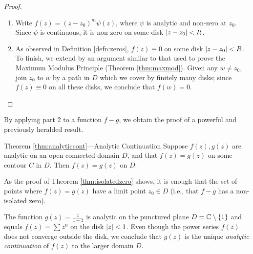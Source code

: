 \begin{proof}
	\begin{enumerate}\itemsep0pt
	  \item Write $f(z)=(z-z_0)^m\psi(z)$, where $\psi$ is analytic and non-zero at $z_0$. Since $\psi$ is continuous, it is non-zero on some disk $\left| z-z_0\right|<R$.
	  \item As observed in Definition \ref{defn:zeros}, $f(z)\equiv 0$ on some disk $\left| z-z_0\right|<R$.\newline
	  To finish, we extend by an argument similar to that used to prove the Maximum Modulus Principle (Theorem \ref{thm:maxmod}). Given any $w\neq z_0$, join $z_0$ to $w$ by a path in $D$ which we cover by finitely many disks; since $f(z)\equiv 0$ on all these disks, we conclude that $f(w)=0$.\qedhere 
	\end{enumerate}
\end{proof}

By applying part 2 to a function $f-g$, we obtain the proof of a powerful and previously heralded result.

\begin{cor}{Theorem \ref{thm:analyticcont}---Analytic Continuation}{}
	Suppose $f(z),g(z)$ are analytic on an open connected domain $D$, and that $f(z)=g(z)$ on some contour $C$ in $D$. Then $f(z)=g(z)$ on $D$.
\end{cor}

As the proof of Theorem \ref{thm:isolatedzero} shows, it is enough that the set of points where $f(z)=g(z)$ have a limit point $z_0\in D$ (i.e., that $f-g$ has a non-isolated zero).


\begin{example}{}{}
	The function $g(z)=\frac 1{1-z}$ is analytic on the punctured plane $D=\mathbb{C}\setminus\{1\}$ and equals $f(z)=\sum z^n$ on the disk $\left| z\right|<1$. Even though the power series $f(z)$ does not converge outside the disk, we conclude that $g(z)$ is the unique \emph{analytic continuation} of $f(z)$ to the larger domain $D$.
\end{example}

\goodbreak


